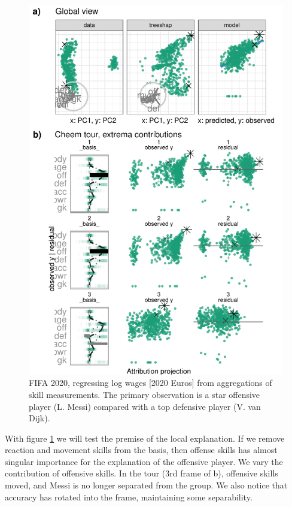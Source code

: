 \documentclass[
  article]{article}
\begin{document}
\begin{figure}

{\centering \includegraphics[width=1\linewidth]{./figures/case_fifa} 

}

\caption{FIFA 2020, regressing log wages [2020 Euros] from aggregations of skill measurements. The primary observation is a star offensive player (L. Messi) compared with a top defensive player (V. van Dijk).}\label{fig:casefifa}
\end{figure}

With figure \ref{fig:casefifa} we will test the premise of the local explanation. If we remove reaction and movement skills from the basis, then offense skills has almost singular importance for the explanation of the offensive player. We vary the contribution of offensive skills. In the tour (3rd frame of b), offensive skills moved, and Messi is no longer separated from the group. We also notice that accuracy has rotated into the frame, maintaining some separability.
\end{document}
